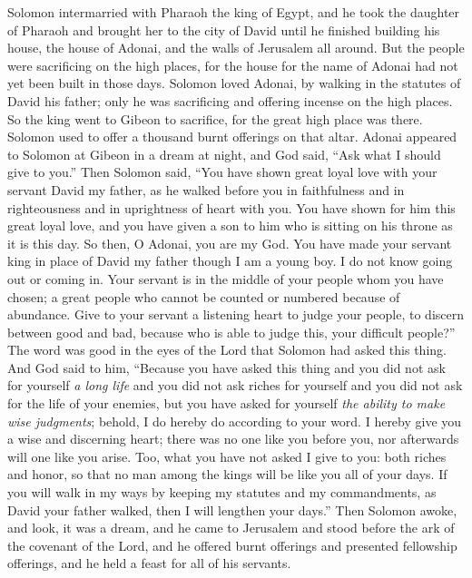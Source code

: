 \begin{biblechapter} %
 Solomon intermarried with Pharaoh the king of Egypt, and he took the daughter of Pharaoh and brought her to the city of David until he finished building his house, the house of Adonai, and the walls of Jerusalem all around.
\verse But the people were sacrificing on the high places, for the house for the name of Adonai had not yet been built in those days.
\verse Solomon loved Adonai, by walking in the statutes of David his father; only he was sacrificing and offering incense on the high places.
\verse So the king went to Gibeon to sacrifice, for the great high place was there. Solomon used to offer a thousand burnt offerings on that altar.
 Adonai appeared to Solomon at Gibeon in a dream at night, and God said, “Ask what I should give to you.”
\verse Then Solomon said, “You have shown great loyal love with your servant David my father, as he walked before you in faithfulness and in righteousness and in uprightness of heart with you. You have shown for him this great loyal love, and you have given a son to him who is sitting on his throne as it is this day.
\verse So then, O Adonai, you are my God. You have made your servant king in place of David my father though I am a young boy. I do not know going out or coming in.
\verse Your servant is in the middle of your people whom you have chosen; a great people who cannot be counted or numbered because of abundance.
\verse Give to your servant a listening heart to judge your people, to discern between good and bad, because who is able to judge this, your difficult people?”
\verse The word was good in the eyes of the Lord that Solomon had asked this thing.
\verse And God said to him, “Because you have asked this thing and you did not ask for yourself \textit{a long life} and you did not ask riches for yourself and you did not ask for the life of your enemies, but you have asked for yourself \textit{the ability to make wise judgments};
\verse behold, I do hereby do according to your word. I hereby give you a wise and discerning heart; there was no one like you before you, nor afterwards will one like you arise.
\verse Too, what you have not asked I give to you: both riches and honor, so that no man among the kings will be like you all of your days.
\verse If you will walk in my ways by keeping my statutes and my commandments, as David your father walked, then I will lengthen your days.”
\verse Then Solomon awoke, and look, it was a dream, and he came to Jerusalem and stood before the ark of the covenant of the Lord, and he offered burnt offerings and presented fellowship offerings, and he held a feast for all of his servants.

\end{biblechapter}
